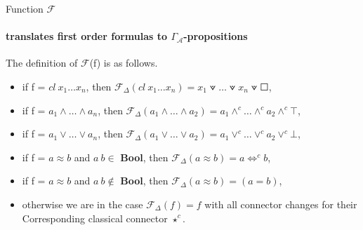 \documentclass[aspectratio=169,xcolor={dvipsnames}]{beamer}
\begin{document}
\begin{frame}{Function $\mathcal{F}$}
\framesubtitle{translates first order formulas to $\Gamma_\mathcal{A}$-propositions}
\begin{definition}[$\mathcal{F}$]
The definition of $\mathcal{F}$(f) is as follows.
\begin{itemize}
\item if f = $cl~ x_1 \dots x_n$, then $\mathcal{F}_\Delta(cl~x_1 \dots x_n)= x_1 \veedot \dots \veedot x_n \veedot \Square$,
\item if f = $a_1 \land \dots \land a_n$, then $\mathcal{F}_\Delta(a_1 \land \dots \land a_2 )= a_1 \land^c \dots \land^c a_2 \land^c \top$,
\item if f = $a_1 \lor \dots \lor a_n$, then $\mathcal{F}_\Delta(a_1 \lor \dots \lor a_2 )= a_1 \lor^c \dots \lor^c a_2 \lor^c \bot$,
\item if f = $a \approx b$ and $a~b \in$ \textbf{Bool}, then $\mathcal{F}_\Delta(a \approx b) = a \iff^c b$,
\item if f = $a \approx b$ and $a~b \notin$ \textbf{Bool}, then $\mathcal{F}_\Delta(a \approx b) = (a = b)$,
\item otherwise we are in the case $\mathcal{F}_\Delta(f) = f$ with all connector changes for their Corresponding classical connector $\star^c$. 
\end{itemize}
\end{definition}
\end{frame}
\end{document}
